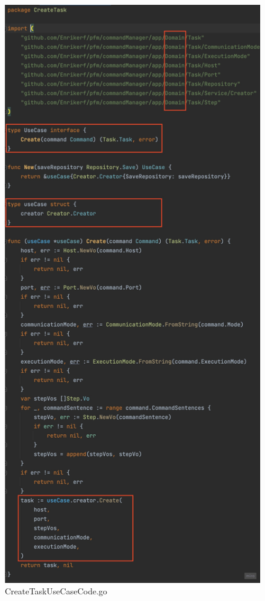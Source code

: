 \begin{figure}[H]
    \includegraphics[height=0.5\textheight]{./part/Ejecucion/Seguimiento/CreateTaskUseCase/img/PFM - CreateTaskUseCaseCode}
    \caption{CreateTaskUseCaseCode.go}\label{fig:CreateTaskUseCaseCode}
\end{figure}

